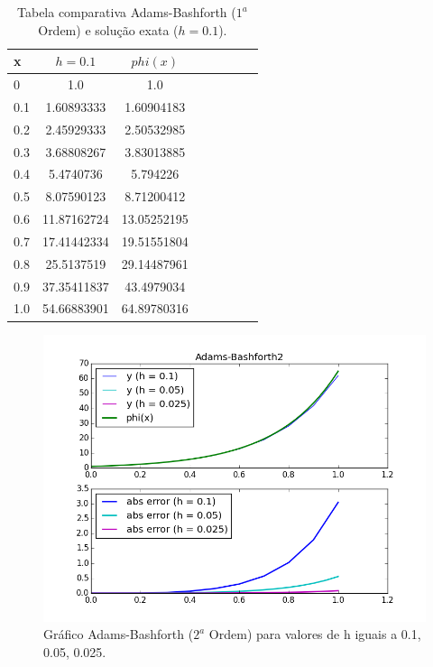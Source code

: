 \documentclass[a4paper]{article}
\begin{document}
\begin{table}[!h]
\centering

\begin{tabular}{l*{6}{c}r}
x               & $h=0.1$ & $phi(x)$ \\
\hline
0                   & 1.0 & 1.0          \\
0.1                 & 1.60893333 & 1.60904183   \\
0.2                 & 2.45929333 & 2.50532985   \\
0.3                 & 3.68808267 & 3.83013885   \\
0.4                 & 5.4740736 & 5.794226     \\
0.5                 & 8.07590123 & 8.71200412   \\
0.6                 & 11.87162724 & 13.05252195  \\
0.7                 & 17.41442334 & 19.51551804  \\
0.8                 & 25.5137519 & 29.14487961  \\
0.9                 & 37.35411837 & 43.4979034   \\
1.0                 & 54.66883901 & 64.89780316  \\
\end{tabular}
\caption{\label{tab:bashforth1}Tabela comparativa Adams-Bashforth ($1^a$ Ordem) e solução exata ($h=0.1$).}
\end{table}

\begin{figure}[b]
\centering
\includegraphics[width=1.0\textwidth]{plots/Adams-Bashforth2.png}
\caption{\label{fig:bashforth2}Gráfico Adams-Bashforth ($2^a$ Ordem) para valores de h iguais a 0.1, 0.05, 0.025.}
\end{figure}
\end{document}
